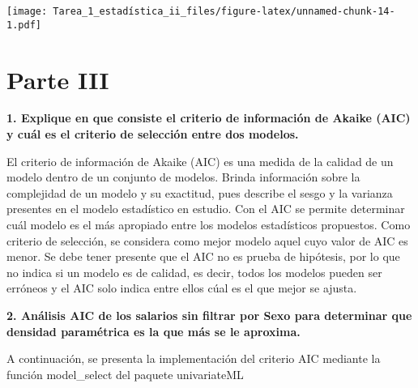 \documentclass[
]{article}
\newenvironment{Shaded}{\begin{snugshade}}{\end{snugshade}}
\newcommand{\AttributeTok}[1]{\textcolor[rgb]{0.13,0.29,0.53}{#1}}
\newcommand{\CommentTok}[1]{\textcolor[rgb]{0.56,0.35,0.01}{\textit{#1}}}
\newcommand{\ConstantTok}[1]{\textcolor[rgb]{0.56,0.35,0.01}{#1}}
\newcommand{\DecValTok}[1]{\textcolor[rgb]{0.00,0.00,0.81}{#1}}
\newcommand{\FunctionTok}[1]{\textcolor[rgb]{0.13,0.29,0.53}{\textbf{#1}}}
\newcommand{\NormalTok}[1]{#1}
\newcommand{\OtherTok}[1]{\textcolor[rgb]{0.56,0.35,0.01}{#1}}
\newcommand{\SpecialCharTok}[1]{\textcolor[rgb]{0.81,0.36,0.00}{\textbf{#1}}}
\newcommand{\StringTok}[1]{\textcolor[rgb]{0.31,0.60,0.02}{#1}}
\begin{document}
\begin{Shaded}
\end{Shaded}

\texttt{[image: Tarea\_1\_estadística\_ii\_files/figure-latex/unnamed-chunk-14-1.pdf]}

\hypertarget{parte-iii}{%
\section{Parte III}\label{parte-iii}}

\textbf{1. Explique en que consiste el criterio de información de Akaike
(AIC) y cuál es el criterio de selección entre dos modelos.}

El criterio de información de Akaike (AIC) es una medida de la calidad
de un modelo dentro de un conjunto de modelos. Brinda información sobre
la complejidad de un modelo y su exactitud, pues describe el sesgo y la
varianza presentes en el modelo estadístico en estudio. Con el AIC se
permite determinar cuál modelo es el más apropiado entre los modelos
estadísticos propuestos. Como criterio de selección, se considera como
mejor modelo aquel cuyo valor de AIC es menor. Se debe tener presente
que el AIC no es prueba de hipótesis, por lo que no indica si un modelo
es de calidad, es decir, todos los modelos pueden ser erróneos y el AIC
solo indica entre ellos cúal es el que mejor se ajusta.

\textbf{2. Análisis AIC de los salarios sin filtrar por Sexo para
determinar que densidad paramétrica es la que más se le aproxima.}

A continuación, se presenta la implementación del criterio AIC mediante
la función model\_select del paquete univariateML

\begin{Shaded}
\end{Shaded}
\end{document}
